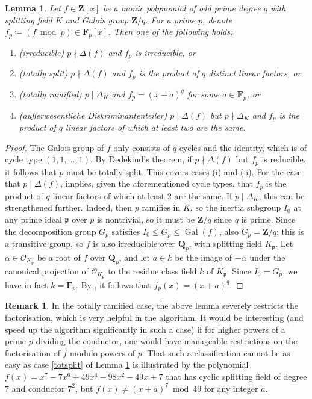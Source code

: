 \documentclass[12pt,reqno]{amsart}
\theoremstyle{definition}
\theoremstyle{plain}
\newtheorem{lemma}[theorem]{Lemma}
\theoremstyle{definition}
\newtheorem{remark}[theorem]{Remark}
\newcommand{\mf}{\mathfrak}
\newcommand{\mc}{\mathcal}
\newcommand{\Z}{\mathbf{Z}}
\newcommand{\Q}{\mathbf{Q}}
\newcommand{\FF}{\mathbf{F}}
\renewcommand{\leq}{\leqslant}
\DeclareMathOperator{\Gal}{Gal}
\begin{document}
\begin{lemma}
\label{lem:merging}
Let $f \in \Z[x]$ be a monic polynomial of odd prime degree $q$ with splitting field $K$ and Galois group $\Z/q$. For a prime $p$, denote $f_p \coloneqq (f \bmod{p}) \in \FF_p[x]$. Then one of the following holds:
\begin{enumerate}
    \item (irreducible) $p \nmid \Delta(f)$ and $f_p$ is irreducible, or
    \item (totally split) $p \nmid \Delta(f)$ and $f_p$ is the product of $q$ distinct linear factors, or
    \item \label{totsplit} (totally ramified) $p \mid \Delta_K$ and $f_p = (x+a)^q$ for some $a \in \FF_p$, or
    \item (\emph{au{\ss}erwesentliche Diskriminantenteiler}) $p \mid \Delta(f)$ but $p \nmid \Delta_K$ and $f_p$ is the product of $q$ linear factors of which at least two are the same.
\end{enumerate}
\end{lemma}
\begin{proof}
The Galois group of $f$ only consists of $q$-cycles and the identity, which is of cycle type $(1,1,...,1)$. By Dedekind's theorem, if $p \nmid \Delta(f)$ but $f_p$ is reducible, it follows that $p$ must be totally split. This covers cases (i) and (ii). For the case that $p \mid \Delta(f)$, \cite[Lemma~11.3]{BKK} implies, given the aforementioned cycle types, that $f_p$ is the product of $q$ linear factors of which at least $2$ are the same.
If $p \mid \Delta_K$, this can be strengthened further. Indeed, then $p$ ramifies in $K$, so the inertia subgroup $I_0$ at any prime ideal $\mf{p}$ over $p$ is nontrivial, so it must be $\Z/q$ since $q$ is prime. Since the decomposition group $G_p$ satisfies $I_0 \leq G_p \leq \Gal(f)$, also $G_p = \Z/q$; this is a transitive group, so $f$ is also irreducible over $\Q_p$, with splitting field $K_{\mf{p}}$. Let $\alpha \in \mc{O}_{K_{\mf{p}}}$ be a root of $f$ over $\Q_p$, and let $a \in k$ be the image of $-\alpha$ under the canonical projection of $\mc{O}_{K_{\mf{p}}}$ to the residue class field $k$ of $K_{\mf{p}}$. Since $I_0 = G_p$, we have in fact $k = \FF_p$. By \cite[Chapter~7, Exercise~7, p.~139]{Cassels}, it follows that $f_p(x) = (x+a)^q$.
\end{proof}

\begin{remark} In the totally ramified case, the above lemma severely restricts the factorisation, which is very helpful in the algorithm. It would be interesting (and speed up the algorithm significantly in such a case) if for higher powers of a prime $p$ dividing the conductor, one would have manageable restrictions on the factorisation of $f$ modulo powers of $p$. That such a classification cannot be as easy as case \eqref{totsplit} of Lemma \ref{lem:merging} is illustrated by the polynomial $f(x) = x^7 - 7 x^6 + 49 x^4 - 98 x^2 - 49 x + 7$ that has cyclic splitting field of degree $7$ and conductor $7^2$, but $f(x) \neq (x+a)^7 \bmod{49}$ for any integer $a$. 
\end{remark}
\end{document}
